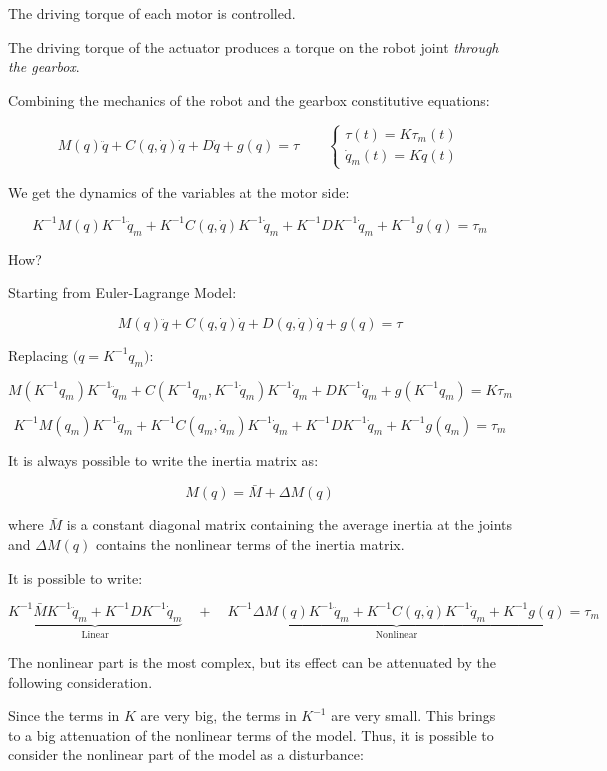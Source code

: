 The driving torque of each motor is controlled.  

The driving torque of the actuator produces a torque on the robot joint \textit{through the gearbox}.

\hfill

Combining the mechanics of the robot and the gearbox constitutive equations:

\[
M(q)\ddot{q} + C(q,\dot{q})\dot{q} + D\dot{q} + g(q) = \tau
\quad\quad
\begin{cases}
\tau(t) = K \tau_m(t) \\
\dot{q}_m(t) = K \dot{q}(t)
\end{cases}
\]

We get the dynamics of the variables at the motor side:

\[
K^{-1}M(q)K^{-1}\ddot{q}_m + K^{-1}C(q,\dot{q})K^{-1}\dot{q}_m + K^{-1}D K^{-1}\dot{q}_m + K^{-1} g(q) = \tau_m
\]

How?

Starting from Euler-Lagrange Model:

\[
M(q)\ddot{q} + C(q,\dot{q})\dot{q} + D(q,\dot{q})\dot{q} + g(q) = \tau
\]

Replacing $\big(q = K^{-1} q_m \big)$:

\[
M\!\left(K^{-1} q_m\right) K^{-1} \ddot{q}_m 
+ C\!\left(K^{-1} q_m, K^{-1}\dot{q}_m\right) K^{-1}\dot{q}_m 
+ D K^{-1}\dot{q}_m 
+ g\!\left(K^{-1} q_m\right) 
= K \tau_m
\]

\[
K^{-1} M(q_m) K^{-1} \ddot{q}_m 
+ K^{-1} C(q_m,\dot{q}_m) K^{-1}\dot{q}_m 
+ K^{-1} D K^{-1}\dot{q}_m 
+ K^{-1} g(q_m) 
= \tau_m
\]

\hfill

It is always possible to write the inertia matrix as:  

\[
M(q) = \bar{M} + \Delta M(q)
\]

where $\bar{M}$ is a constant diagonal matrix containing the average inertia at the joints and $\Delta M(q)$ contains the nonlinear terms of the inertia matrix.  

It is possible to write:

\[
\underbrace{K^{-1}\bar{M}K^{-1}\ddot{q}_m + K^{-1}D K^{-1}\dot{q}_m}_{\text{Linear}} 
\quad + \quad 
\underbrace{K^{-1}\Delta M(q)K^{-1}\ddot{q}_m + K^{-1}C(q,\dot{q})K^{-1}\dot{q}_m + K^{-1}g(q)}_{\text{Nonlinear}}
= \tau_m
\]

The nonlinear part is the most complex, but its effect can be attenuated by the following consideration.

Since the terms in $K$ are very big, the terms in $K^{-1}$ are very small. This brings to a big attenuation of the nonlinear terms of the model. Thus, it is possible to consider the nonlinear part of the model as a disturbance:  

